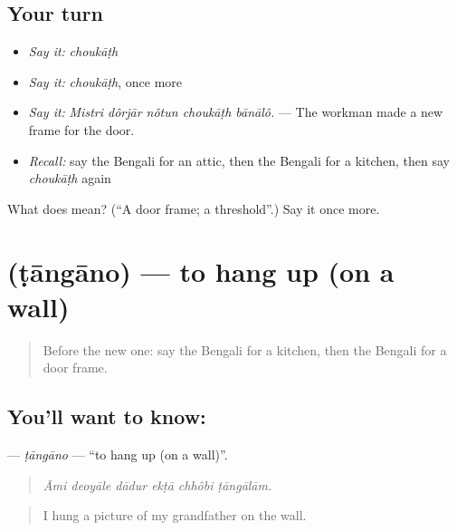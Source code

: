 \subsection*{Your turn}
\begin{itemize}
\raggedright
  \item \emph{Say it:} \emph{choukāṭh}
  \item \emph{Say it:} \emph{choukāṭh}, once more
  \item \emph{Say it:} \emph{Mistri dôrjār nôtun choukāṭh bānālô.} — The workman made a new frame for the door.
  \item \emph{Recall:} say the Bengali for an attic, then the Bengali for a kitchen, then say \emph{choukāṭh} again
\end{itemize}

\begin{tcolorbox}[breakable,colback=teal!4,colframe=teal!35!black,title={Before you move on}]
What does  mean? (\textquotedblleft{}A door frame; a threshold\textquotedblright{}.) Say it once more.
\end{tcolorbox}
\section[\texorpdfstring{\bn{টাঙানো} (ṭāngāno)}{টাঙানো (ṭāngāno)}]{ (ṭāngāno) — to hang up (on a wall)}

\label{lesson:BN-C508-tangano}



\begin{quote}
Before the new one: say the Bengali for a kitchen, then the Bengali for a door frame.
\end{quote}

\subsection*{You'll want to know: }
\textbf{} — \emph{ṭāngāno} — \textquotedblleft{}to hang up (on a wall)\textquotedblright{}.

\begin{quote}
     
\end{quote}

\begin{quote}
\emph{Āmi deoyāle dādur ekṭā chhôbi ṭāngālām.}
\end{quote}

\begin{quote}
I hung a picture of my grandfather on the wall.
\end{quote}

